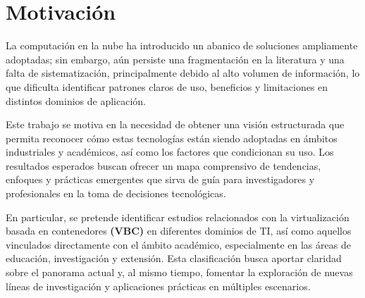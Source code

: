 \section{Motivación}
La computación en la nube ha introducido un abanico de soluciones ampliamente adoptadas; sin embargo, aún persiste una fragmentación en la literatura y una falta de sistematización, principalmente debido al alto volumen de información, lo que dificulta identificar patrones claros de uso, beneficios y limitaciones en distintos dominios de aplicación.

Este trabajo se motiva en la necesidad de obtener una visión estructurada que permita reconocer cómo estas tecnologías están siendo adoptadas en ámbitos industriales y académicos, así como los factores que condicionan su uso. Los resultados esperados buscan ofrecer un mapa comprensivo de tendencias, enfoques y prácticas emergentes que sirva de guía para investigadores y profesionales en la toma de decisiones tecnológicas.

En particular, se pretende identificar estudios relacionados con la virtualización basada en contenedores \textbf{(VBC)} en diferentes dominios de TI, así como aquellos vinculados directamente con el ámbito académico, especialmente en las áreas de educación, investigación y extensión. Esta clasificación busca aportar claridad sobre el panorama actual y, al mismo tiempo, fomentar la exploración de nuevas líneas de investigación y aplicaciones prácticas en múltiples escenarios.